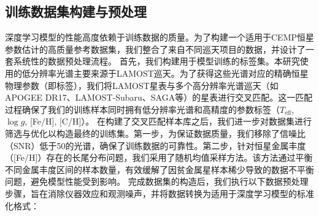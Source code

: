 \subsection{训练数据集构建与预处理}
\label{sec:data_preparation}
深度学习模型的性能高度依赖于训练数据的质量。为了构建一个适用于CEMP恒星参数估计的高质量参考数据集，我们整合了来自不同巡天项目的数据，并设计了一套系统性的数据预处理流程。
首先，我们构建用于模型训练的标签集。本研究使用的低分辨率光谱主要来源于LAMOST巡天。为了获得这些光谱对应的精确恒星物理参数（即标签），我们将LAMOST星表与多个高分辨率光谱巡天（如APOGEE DR17、LAMOST-Subaru、SAGA等）的星表进行交叉匹配。这一匹配过程确保了我们的训练样本同时拥有低分辨率光谱和高精度的参数标签（$T_{\text{eff}}$, $\log g$, [Fe/H], [C/H]）。
在构建了交叉匹配样本库之后，我们进一步对数据集进行筛选与优化以构造最终的训练集。第一步，为保证数据质量，我们移除了信噪比（SNR）低于50的光谱，确保了训练数据的可靠性。第二步，针对恒星金属丰度（[Fe/H]）存在的长尾分布问题，我们采用了随机均值采样方法。该方法通过平衡不同金属丰度区间的样本数量，有效缓解了因贫金属星样本稀少导致的数据不平衡问题，避免模型性能受到影响。
完成数据集的构造后，我们执行以下数据预处理步骤，旨在消除仪器效应和观测噪声，并将数据转换为适用于深度学习模型的标准化格式：
